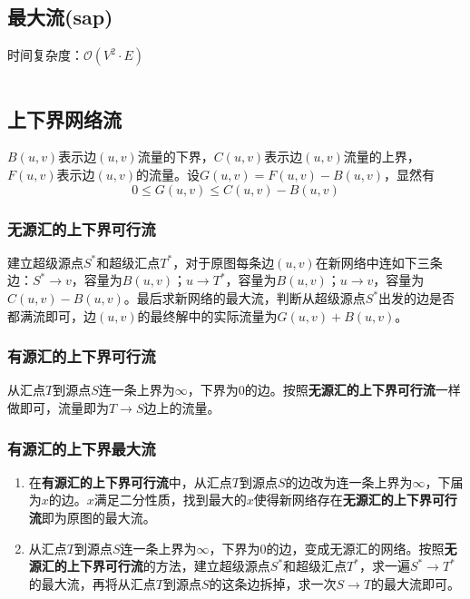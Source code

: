 \documentclass[a4paper]{article}
\newcommand{\cppcode}[1]{
    \inputminted[mathescape,
    frame=lines,linenos]{cpp}{source/#1}
}
\begin{document}
\subsection{最大流(sap)}
时间复杂度：$\mathcal{O}(V^2 \cdot E)$
\cppcode{graph-theory/Sap.cpp}


\subsection{上下界网络流}

$B(u,v)$表示边$(u,v)$流量的下界，$C(u,v)$表示边$(u,v)$流量的上界，$F(u,v)$表示边$(u,v)$的流量。设$G(u,v) = F(u,v) - B(u,v)$，显然有
$$0 \leq G(u,v) \leq C(u,v)-B(u,v)$$

\subsubsection{无源汇的上下界可行流}

建立超级源点$S^*$和超级汇点$T^*$，对于原图每条边$(u,v)$在新网络中连如下三条边：$S^* \rightarrow v$，容量为$B(u,v)$；$u \rightarrow T^*$，容量为$B(u,v)$；$u \rightarrow v$，容量为$C(u,v) - B(u,v)$。最后求新网络的最大流，判断从超级源点$S^*$出发的边是否都满流即可，边$(u,v)$的最终解中的实际流量为$G(u,v)+B(u,v)$。

\subsubsection{有源汇的上下界可行流}

从汇点$T$到源点$S$连一条上界为$\infty$，下界为$0$的边。按照\textbf{无源汇的上下界可行流}一样做即可，流量即为$T \rightarrow S$边上的流量。

\subsubsection{有源汇的上下界最大流}

\begin{enumerate}
	\item 在\textbf{有源汇的上下界可行流}中，从汇点$T$到源点$S$的边改为连一条上界为$\infty$，下届为$x$的边。$x$满足二分性质，找到最大的$x$使得新网络存在\textbf{无源汇的上下界可行流}即为原图的最大流。
	\item 从汇点$T$到源点$S$连一条上界为$\infty$，下界为$0$的边，变成无源汇的网络。按照\textbf{无源汇的上下界可行流}的方法，建立超级源点$S^*$和超级汇点$T^*$，求一遍$S^* \rightarrow T^*$的最大流，再将从汇点$T$到源点$S$的这条边拆掉，求一次$S \rightarrow T$的最大流即可。
\end{enumerate}
\end{document}
